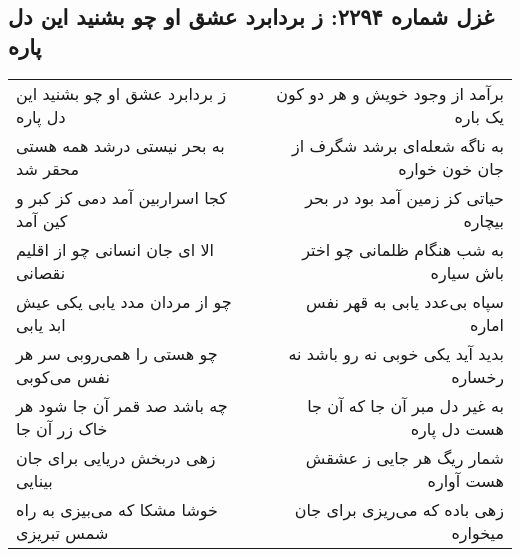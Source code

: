 \begin{center}
\section*{غزل شماره ۲۲۹۴: ز بردابرد عشق او چو بشنید این دل پاره}
\label{sec:2294}
\begin{longtable}{l p{0.5cm} r}
ز بردابرد عشق او چو بشنید این دل پاره
&&
برآمد از وجود خویش و هر دو کون یک باره
\\
به بحر نیستی درشد همه هستی محقر شد
&&
به ناگه شعله‌ای برشد شگرف از جان خون خواره
\\
کجا اسراربین آمد دمی کز کبر و کین آمد
&&
حیاتی کز زمین آمد بود در بحر بیچاره
\\
الا ای جان انسانی چو از اقلیم نقصانی
&&
به شب هنگام ظلمانی چو اختر باش سیاره
\\
چو از مردان مدد یابی یکی عیش ابد یابی
&&
سپاه بی‌عدد یابی به قهر نفس اماره
\\
چو هستی را همی‌روبی سر هر نفس می‌کوبی
&&
بدید آید یکی خوبی نه رو باشد نه رخساره
\\
چه باشد صد قمر آن جا شود هر خاک زر آن جا
&&
به غیر دل مبر آن جا که آن جا هست دل پاره
\\
زهی دربخش دریایی برای جان بینایی
&&
شمار ریگ هر جایی ز عشقش هست آواره
\\
خوشا مشکا که می‌بیزی به راه شمس تبریزی
&&
زهی باده که می‌ریزی برای جان میخواره
\\
\end{longtable}
\end{center}
